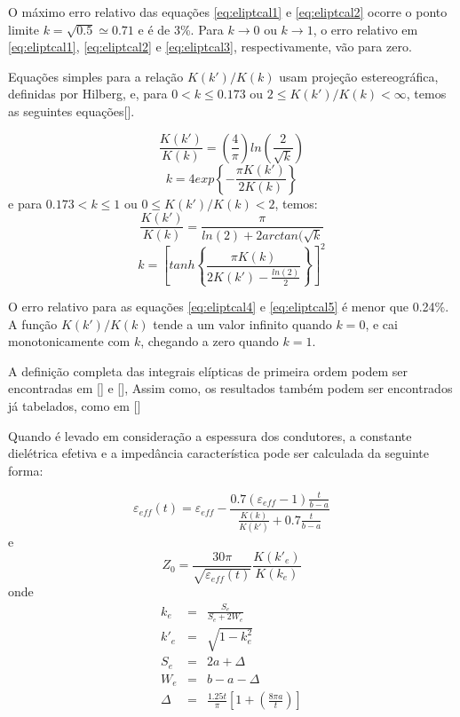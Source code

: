 O máximo erro relativo das equações \ref{eq:eliptcal1} e \ref{eq:eliptcal2} ocorre o ponto limite $k = \sqrt{0.5} \simeq 0.71$ e é de 3\%. Para $k \rightarrow 0 $ ou $k \rightarrow 1$, o erro relativo em \ref{eq:eliptcal1}, \ref{eq:eliptcal2} e \ref{eq:eliptcal3}, respectivamente, vão para zero. 

Equações simples para a relação $ K(k')/K(k) $ usam projeção estereográfica, definidas por Hilberg, e, para $ 0< k \leq 0.173 $ ou $2 \leq K(k')/K(k) < \infty $, temos as seguintes equações[\cite{Hoffmann}].

\begin{equation}
\label{eq:eliptcal4}
\frac{K(k')}{K(k)} = \left(\frac{4}{\pi} \right) ln\left(\frac{2}{\sqrt{k}}\right)
\end{equation}
\begin{equation}
k = 4 exp\left\lbrace -\frac{\pi K(k')}{2K(k)}\right\rbrace
\end{equation}
e para $ 0.173 < k \leq 1 $ ou $0 \leq K(k')/K(k) < 2 $, temos:
\begin{equation}
\label{eq:eliptcal5}
\frac{K(k')}{K(k)} = \frac{\pi}{ln(2) + 2arctan(\sqrt{k}}
\end{equation}
\begin{equation}
k = \left[tanh\left\lbrace \frac{\pi K(k)}{2K(k') - \frac{ln(2)}{2}}\right\rbrace \right]^2
\end{equation}

O erro relativo para as equações \ref{eq:eliptcal4} e \ref{eq:eliptcal5} é menor que 0.24\%. A função $ K(k')/K(k)$ tende a um valor infinito quando $k=0$, e cai monotonicamente com $k$, chegando a zero quando $k=1$.

A definição completa das integrais elípticas de primeira ordem podem ser encontradas em [\cite{Alan}] e [\cite{Byrd}], Assim como, os resultados também podem ser encontrados já tabelados, como em [\cite{Eugene}]

Quando é levado em consideração a espessura dos condutores, a constante dielétrica efetiva e a impedância característica pode ser calculada da seguinte forma:

\begin{equation}
\displaystyle
\varepsilon_{eff}(t) = \varepsilon_{eff} - \frac{0.7(\varepsilon_{eff}-1)\frac{t}{b-a}}{\frac{K(k)}{K(k')} + 0.7\frac{t}{b-a}}
\end{equation}
e
\begin{equation}
\displaystyle
Z_0 = \frac{30\pi}{\sqrt{\varepsilon_{eff}(t)}}\frac{K(k'_e)}{K(k_e)} 
\end{equation}
onde 
\begin{eqnarray}
\displaystyle
k_e &=& \frac{S_e}{S_e+2W_e}\\
k'_e &=& \sqrt{1 - k^2_e}\\
S_e &=& 2a + \Delta\\
W_e &=& b-a-\Delta\\
\Delta &=&  \frac{1.25t}{\pi} \left[1+\left(\frac{8\pi a}{t}\right)\right]
\end{eqnarray}


